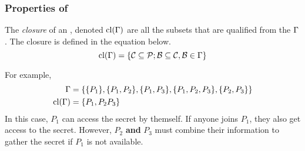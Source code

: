 \subsubsection{Properties of }\label{subsubsec:Properties_Access_Structures}
\begin{definition}[Closure]\label{def:Closure_Access_Structure}
  The \emph{closure} of an , denoted $\operatorname{\text{cl}}(\operatorname{\Gamma})$ are all the subsets that are qualified from the  $\operatorname{\Gamma}$.
  The closure is defined in the equation below.
  \begin{equation}\label{eq:Closure_Access_Structure}
    \operatorname{\text{cl}}(\operatorname{\Gamma}) = \lbrace \operatorname{\mathcal{C}} \subseteq \operatorname{\mathcal{P}}; \operatorname{\mathcal{B}} \subseteq \operatorname{\mathcal{C}}, \operatorname{\mathcal{B}} \in \operatorname{\Gamma} \rbrace
  \end{equation}

  For example,
  \begin{align*}
    \operatorname{\Gamma} &= \lbrace \lbrace P_{1} \rbrace, \lbrace P_{1}, P_{2} \rbrace, \lbrace P_{1}, P_{3} \rbrace, \lbrace P_{1}, P_{2}, P_{3} \rbrace, \lbrace P_{2}, P_{3} \rbrace \rbrace \\
    \operatorname{\text{cl}}(\operatorname{\Gamma}) &= \lbrace P_{1}, P_{2}P_{3} \rbrace
  \end{align*}
  In this case, $P_{1}$ can access the secret by themself.
  If anyone joins $P_{1}$, they also get access to the secret.
  However, $P_{2}$ \textbf{and} $P_{3}$ must combine their information to gather the secret if $P_{1}$ is not available.
\end{definition}


